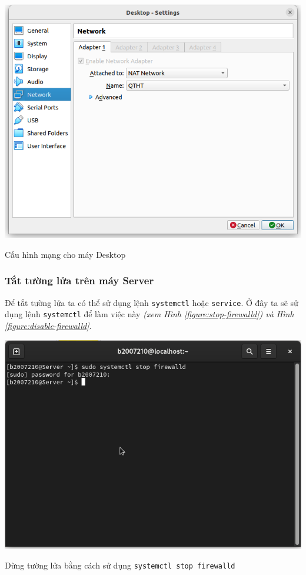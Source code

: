 \documentclass[a4paper, 11pt]{article}
\begin{document}
\begin{enumerate}
          \begin{minipage}
              {\linewidth}
              \captionsetup{type=figure}
              \centering
              \includegraphics[width=\linewidth]{images/desktop-network.png}
              \caption{Cấu hình mạng cho máy Desktop}
              \label{figure:desktop-network}
          \end{minipage}
\end{enumerate}

\subsubsection{Tắt tường lửa trên máy Server}

Để tắt tường lửa ta có thể sử dụng lệnh \texttt{systemctl} hoặc \texttt{service}.
Ở đây ta sẽ sử dụng lệnh \texttt{systemctl} để làm việc này \textit{(xem Hình \ref{figure:stop-firewalld}) và Hình \ref{figure:disable-firewalld}}. \\

\begin{minipage}
    {\linewidth}
    \captionsetup{type=figure}
    \centering
    \includegraphics[width=\linewidth]{images/stop-firewalld.png}
    \caption{Dừng tường lửa bằng cách sử dụng \texttt{systemctl stop firewalld}}
    \label{figure:stop-firewalld}
\end{minipage}
\end{document}
